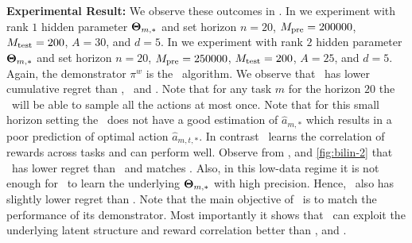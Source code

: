 \textbf{Experimental Result:} We observe these outcomes in . In  we experiment with rank $1$ hidden parameter $\mathbf{\Theta}_{m,*}$ and set horizon $n=20$, $M_{\text{pre}} =  200000$, $M_{\text{test}} = 200$, $A=30$, and $d=5$. 
%
In  we experiment with rank $2$ hidden parameter $\mathbf{\Theta}_{m,*}$ and set horizon $n=20$, $M_{\text{pre}} =  250000$, $M_{\text{test}} = 200$, $A=25$, and $d=5$. 
%
%
Again, the demonstrator $\pi^w$ is the \ts\ algorithm. We observe that \pred\ has lower cumulative regret than \dptg, \ad\ and \ts. Note that for any task $m$ for the horizon $20$ the \ts\ will be able to sample all the actions at most once.
%
%
Note that for this small horizon setting the \dptg\ does not have a good estimation of $\widehat{a}_{m,*}$ which results in a poor prediction of optimal action $\widehat{a}_{m,t,*}$. In contrast \pred\ learns the correlation of rewards across tasks and can perform well.
Observe from , and \ref{fig:bilin-2} that \pred\ has lower regret than \ts\ and matches \estr. Also, in this low-data regime it is not enough for \estr\ to learn the underlying $\mathbf{\Theta}_{m, *}$ with high precision. Hence, \pred\ also has slightly lower regret than \estr. 
%
Note that the main objective of \ad\ is to match the performance of its demonstrator.
%
Most importantly it shows that \pred\ can exploit the underlying latent structure and reward correlation better than \dptg, and \ad.
